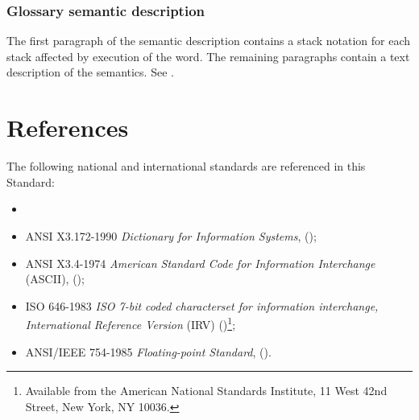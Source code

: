 \subsubsection{Glossary semantic description}

The first paragraph of the semantic description contains a stack
notation for each stack affected by execution of the word. The
remaining paragraphs contain a text description of the semantics.
See .

\section{References}

The following national and international standards are referenced
in this Standard:

\begin{itemize}
\item {}

\item ANSI X3.172-1990 \textit{Dictionary for Information Systems},
	();

\item ANSI X3.4-1974 \textit{American Standard Code for Information
	Interchange} (ASCII),
	();

\item ISO 646-1983 \textit{ISO 7-bit coded characterset for
	information interchange, International Reference Version} (IRV)
	()\footnote{Available from
	the American National Standards Institute, 11 West 42nd Street,
	New York, NY 10036.};

\item ANSI/IEEE 754-1985 \textit{Floating-point Standard},
	().
\end{itemize}
